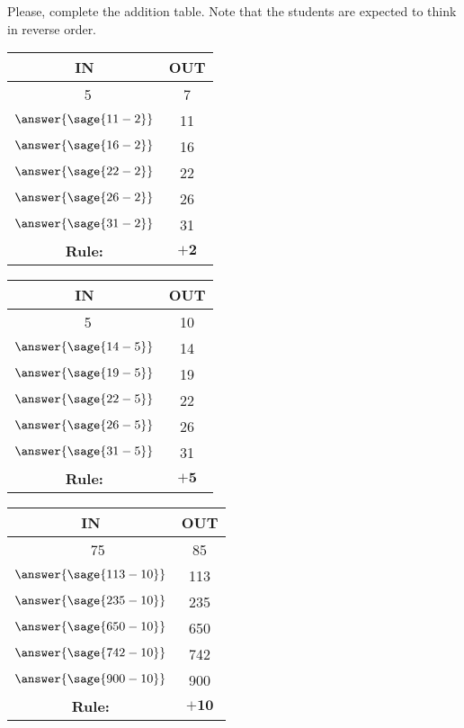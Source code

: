 \documentclass{ximera}
\begin{document}
\begin{problem}
Please, complete the addition table. Note that the students are expected to think in reverse order.

\setlength\extrarowheight{12pt}
\begin{tabular}[c]{|c|c|}
\hline
 IN & OUT \\
 \hline
 ~5 & 7 \\
 \hline
 $\answer{\sage{11-2}}$ & 11 \\
 \hline
 $\answer{\sage{16-2}}$  & 16 \\
 \hline
 $\answer{\sage{22-2}}$  & 22 \\
 \hline
  $\answer{\sage{26-2}}$ & 26 \\
 \hline
  $\answer{\sage{31-2}}$ & 31 \\
 \hline
 \textbf{Rule:} & $\mathbf{+2}$ \\
 \hline
\end{tabular}
\hfill
\begin{tabular}[c]{|c|c|}
\hline
 IN & OUT \\
 \hline
 ~5 & 10 \\
 \hline
  $\answer{\sage{14-5}}$ & 14 \\
 \hline
 $\answer{\sage{19-5}}$  & 19 \\
 \hline
 $\answer{\sage{22-5}}$  & 22 \\
 \hline
 $\answer{\sage{26-5}}$  & 26 \\
 \hline
 $\answer{\sage{31-5}}$  & 31 \\
 \hline
 \textbf{Rule:} & $\mathbf{+5}$ \\
 \hline
\end{tabular}
\hfill
\begin{tabular}[c]{|c|c|}
\hline
 IN & OUT \\
 \hline
 ~~75 & 85 \\
 \hline
 $\answer{\sage{113-10}}$  & 113 \\
 \hline
 $\answer{\sage{235-10}}$  & 235 \\
 \hline
 $\answer{\sage{650-10}}$  & 650 \\
 \hline
 $\answer{\sage{742-10}}$  & 742 \\
 \hline
 $\answer{\sage{900-10}}$  & 900 \\
 \hline
 \textbf{Rule:} & $\mathbf{+10}$ \\
 \hline
\end{tabular}
\end{problem}
\end{document}
